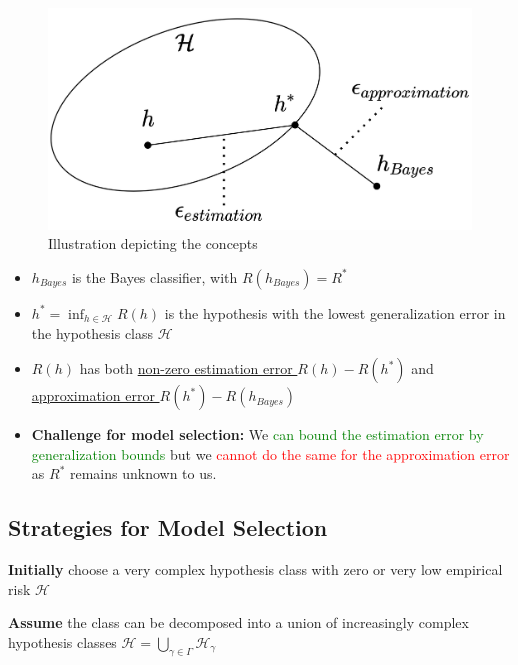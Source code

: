 \documentclass[12pt, a4paper]{article}
\begin{document}
\begin{figure}[H]
  \centering  %
    \includegraphics[width=0.6\columnwidth]{images/estimation-approximation-error.png}
    \caption{Illustration depicting the concepts}
    \label{fig:estimation-approximation-error}
\end{figure}
\begin{itemize}
  \item $h_{Bayes}$ is the Bayes classifier, with $R(h_{Bayes}) = R^*$
  \item $h^* = \inf_{h \in \mathcal{H}} R(h)$ is the hypothesis with the lowest generalization error in the hypothesis class $\mathcal{H}$
  \item $R(h)$ has both \uline{non-zero estimation error $R(h) - R(h^*)$} and \uline{approximation error $R(h^*) - R(h_{Bayes})$}
  \item \textbf{Challenge for model selection:} We \textcolor{Green}{can bound the estimation error by generalization bounds} but we \textcolor{red}{cannot do the same for the approximation error} as $R^*$ remains unknown to us.
\end{itemize}









\subsection{Strategies for Model Selection}\label{strategies-for-model-selection}




\textbf{Initially} choose a very complex hypothesis class with zero or very low empirical risk $\mathcal{H}$

\textbf{Assume} the class can be decomposed into a union of increasingly complex hypothesis classes $\mathcal{H} = \bigcup_{\gamma \in \Gamma} \mathcal{H}_\gamma$
\end{document}
